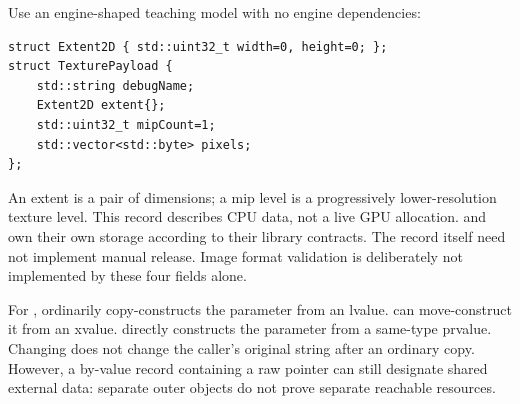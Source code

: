 Use an engine-shaped teaching model with no engine dependencies:

\begin{verbatim}
struct Extent2D { std::uint32_t width=0, height=0; };
struct TexturePayload {
    std::string debugName;
    Extent2D extent{};
    std::uint32_t mipCount=1;
    std::vector<std::byte> pixels;
};
\end{verbatim}

An extent is a pair of dimensions; a mip level is a progressively lower-resolution texture level. This record describes CPU data, not a live GPU allocation.  and  own their own storage according to their library contracts. The record itself need not implement manual release. Image format validation is deliberately not implemented by these four fields alone.

For ,  ordinarily copy-constructs the parameter from an lvalue.  can move-construct it from an xvalue.  directly constructs the parameter from a same-type prvalue. Changing  does not change the caller's original string after an ordinary copy. However, a by-value record containing a raw pointer can still designate shared external data: separate outer objects do not prove separate reachable resources.

